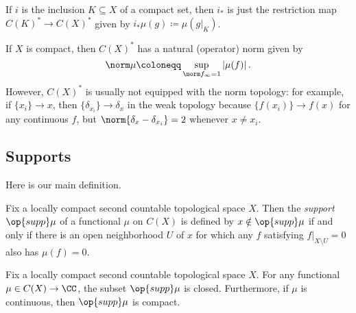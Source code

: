 \documentclass[../notes.tex]{subfiles}
\begin{document}
\begin{remark}
	If $i$ is the inclusion $K\subseteq X$ of a compact set, then $i_*$ is just the restriction map $C(K)^*\to C(X)^*$ given by $i_*\mu(g)\coloneqq\mu(g|_K)$.
\end{remark}
\begin{remark}
	If $X$ is compact, then $C(X)^*$ has a natural (operator) norm given by
	\[\norm\mu\coloneqq\sup_{\norm f_\infty=1}\left|\mu(f)\right|.\]
	However, $C(X)^*$ is usually not equipped with the norm topology: for example, if $\{x_i\}\to x$, then $\{\delta_{x_i}\}\to\delta_x$ in the weak topology because $\{f(x_i)\}\to f(x)$ for any continuous $f$, but $\norm{\delta_x-\delta_{x_i}}=2$ whenever $x\ne x_i$.
\end{remark}

\subsection{Supports}
Here is our main definition.
\begin{definition}[support]
	Fix a locally compact second countable topological space $X$. Then the \textit{support} $\op{supp}\mu$ of a functional $\mu$ on $C(X)$ is defined by $x\notin\op{supp}\mu$ if and only if there is an open neighborhood $U$ of $x$ for which any $f$ satisfying $f|_{X\setminus U}=0$ also has $\mu(f)=0$.
\end{definition}
\begin{lemma} \label{lem:supp-compact}
	Fix a locally compact second countable topological space $X$. For any functional $\mu\in C(X)\to\CC$, the subset $\op{supp}\mu$ is closed. Furthermore, if $\mu$ is continuous, then $\op{supp}\mu$ is compact.
\end{lemma}
\end{document}
